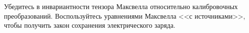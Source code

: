 \documentclass[__main__.tex]{subfiles}
\begin{document}
Убедитесь в инвариантности тензора Максвелла относительно калибровочных преобразований. Воспользуйтесь уравнениями Максвелла <<с источниками>>, чтобы получить закон сохранения электрического заряда.\\ 

\end{document}
